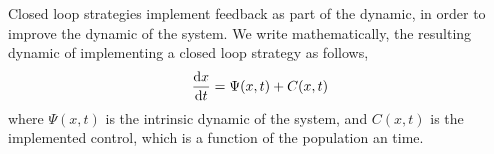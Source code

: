 Closed loop strategies implement feedback as part of the dynamic, in order to improve the dynamic of the system. We write mathematically, the resulting dynamic of implementing a closed loop strategy as follows,
\begin{equation}
\frac{\mathrm{d} x}{{\mathrm{d} t}}=\Psi(x,t)+C(x,t)
\end{equation}
where $\Psi(x,t)$ is the intrinsic dynamic of the system, and $C(x,t)$ is the implemented control, which is a function of the population an time.